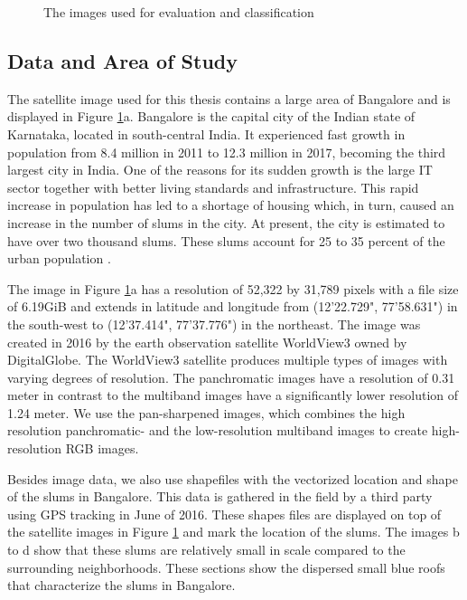 \begin{figure}
\begin{tabular}{cc}
	\end{tabular}
	\caption{The images used for evaluation and classification}
	\label{fig:sections}
\end{figure}


\subsection{Data and Area of Study}
The satellite image used for this thesis contains a large area of Bangalore and is displayed in Figure \ref{fig:sections}a. Bangalore is the capital city of the Indian state of Karnataka, located in south-central India. It experienced fast growth in population from 8.4 million in 2011 to 12.3 million in 2017, becoming the third largest city in India\cite{popcount2017}. One of the reasons for its sudden growth is the large IT sector together with better living standards and infrastructure. This rapid increase in population has led to a shortage of housing which, in turn, caused an increase in the number of slums in the city. At present, the city is estimated to have over two thousand slums. These slums account for 25 to 35 percent of the urban population \cite{roy2018survey}.

The image in Figure \ref{fig:sections}a has a resolution of 52,322 by 31,789 pixels with a file size of 6.19GiB and extends in latitude and longitude from  (12'22.729", 77'58.631") in the south-west to (12'37.414", 77'37.776") in the northeast. The image was created in 2016 by the earth observation satellite WorldView3 owned by DigitalGlobe. The WorldView3 satellite produces multiple types of images with varying degrees of resolution. The panchromatic images have a resolution of 0.31 meter in contrast to the multiband images have a significantly lower resolution of 1.24 meter. We use the pan-sharpened images, which combines the high resolution panchromatic- and the low-resolution multiband images to create high-resolution RGB images.

Besides image data, we also use shapefiles with the vectorized location and shape of the slums in Bangalore. This data is gathered in the field by a third party using GPS tracking in June of 2016. These shapes files are displayed on top of the satellite images in Figure \ref{fig:sections} and mark the location of the slums. The images b to d show that these slums are relatively small in scale compared to the surrounding neighborhoods. These sections show the dispersed small blue roofs that characterize the slums in Bangalore. 

